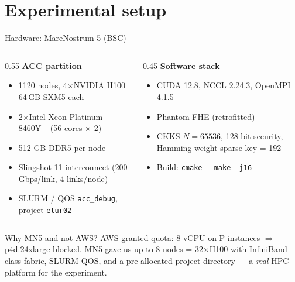 \documentclass[aspectratio=169]{beamer}
\begin{document}
\section{Experimental setup}

\begin{frame}{Hardware: MareNostrum 5 (BSC)}
  \begin{columns}[T]
    \begin{column}{0.55\textwidth}
      \textbf{ACC partition}
      \begin{itemize}\small
        \item 1120 nodes, 4$\times$NVIDIA H100 64\,GB SXM5 each
        \item 2$\times$Intel Xeon Platinum 8460Y+ (56 cores $\times$ 2)
        \item 512 GB DDR5 per node
        \item Slingshot-11 interconnect (200 Gbps/link, 4 links/node)
        \item SLURM / QOS \texttt{acc\_debug}, project \texttt{etur02}
      \end{itemize}
    \end{column}
    \begin{column}{0.45\textwidth}
      \textbf{Software stack}
      \begin{itemize}\small
        \item CUDA 12.8, NCCL 2.24.3, OpenMPI 4.1.5
        \item Phantom FHE (retrofitted)
        \item CKKS $N{=}65536$, 128-bit security,
              Hamming-weight sparse key = 192
        \item Build: \texttt{cmake} + \texttt{make -j16}
      \end{itemize}
    \end{column}
  \end{columns}
  \vspace{0.6em}
  \begin{block}{Why MN5 and not AWS?}
    \footnotesize
    AWS-granted quota: 8 vCPU on P-instances $\Rightarrow$ p4d.24xlarge blocked.
    MN5 gave us up to 8 nodes = 32$\times$H100 with InfiniBand-class fabric, SLURM QOS,
    and a pre-allocated project directory — a \emph{real} HPC platform for the
    experiment.
  \end{block}
\end{frame}

\end{document}
